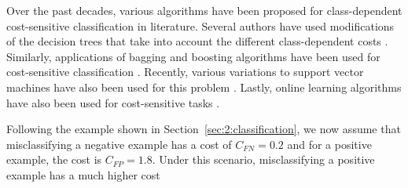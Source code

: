 Over the past decades, various algorithms have been proposed for class-dependent cost-sensitive 
classification in literature. Several authors have used modifications of the decision trees that 
take into account the different class-dependent costs 
\citep{Draper1994,Ting2002,Ling2004,Li2005,Kretowski2006,Vadera2010,Lomax2013}.
Similarly, applications of bagging and boosting algorithms have been used for cost-sensitive 
classification \citep{Nesbitt2010,Street2008,Masnadi-shirazi2011,Fan1999}. Recently, various 
variations to support vector machines have also been used for this problem
\citep{Li2010,Masnadi-shirazi2010}. Lastly, online learning algorithms have also been used for 
cost-sensitive tasks \citep{Wang2014}.

Following the example shown in Section~\ref{sec:2:classification}, we now assume that 
misclassifying a negative example has a cost of $C_{FN}=0.2$ and for a positive example, the cost 
is  $C_{FP}=1.8$. Under this scenario, misclassifying a positive example has a much higher cost 
